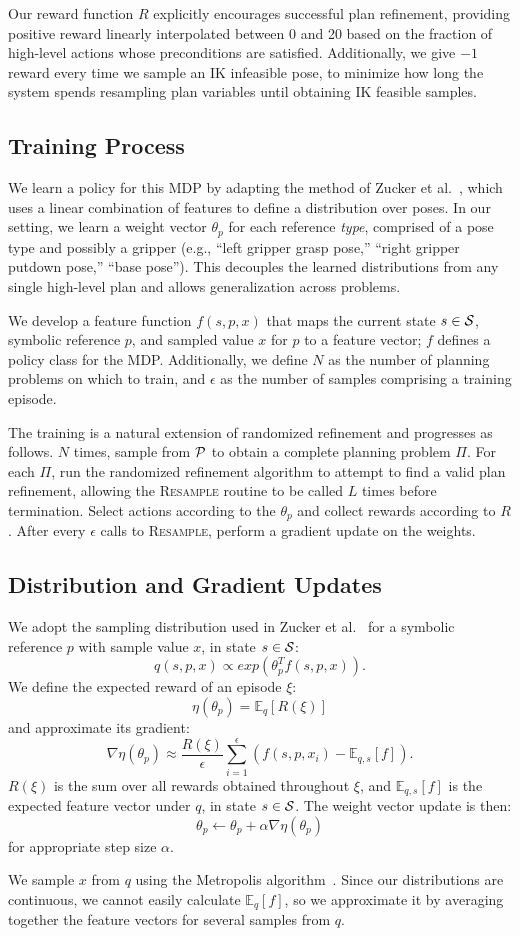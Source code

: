 Our reward function $R$ explicitly encourages successful plan refinement, providing positive reward linearly
interpolated between 0 and 20 based on the fraction of high-level actions whose preconditions are
satisfied. Additionally, we give $-1$ reward every time we sample an IK infeasible pose,
to minimize how long the system spends resampling plan variables until obtaining IK feasible samples.

\subsection{Training Process}
We learn a policy for this MDP by adapting the method of Zucker et al.~\cite{workspacebias}, which
uses a linear combination of features to define a distribution over poses. In our setting, we learn a weight
vector $\theta_{p}$ for each reference \emph{type}, comprised of a pose type and possibly a gripper
(e.g., ``left gripper grasp pose,'' ``right gripper putdown pose,'' ``base pose'').
This decouples the learned distributions from any single high-level plan and allows generalization across problems.

We develop a feature function $f(s, p, x)$ that maps the current
state $s \in \mathcal{S}$, symbolic reference $p$, and sampled value $x$ for $p$ to a
feature vector; $f$ defines a policy class for the MDP. Additionally, we define
$N$ as the number of planning problems on which to train, and
$\epsilon$ as the number of samples comprising a training episode.

The training is a natural extension of randomized
refinement and progresses as follows. $N$ times, sample from $\mathcal{P}$ to obtain
a complete planning problem $\Pi$. For each $\Pi$, run the randomized refinement
algorithm to attempt to find a valid plan refinement, allowing the \textsc{Resample}
routine to be called $L$ times before termination. Select actions according to the $\theta_{p}$
and collect rewards according to $R$. After every $\epsilon$ calls to
\textsc{Resample}, perform a gradient update on the weights.

\subsection{Distribution and Gradient Updates}
We adopt the sampling distribution used in Zucker et al.~\cite{workspacebias}
for a symbolic reference $p$ with sample value $x$, in state $s \in \mathcal{S}$:
$$q(s, p, x) \propto exp(\theta_{p}^{T} f(s, p, x)).$$
We define the expected reward of an episode $\xi$:
$$\eta(\theta_{p}) = \mathbb{E}_{q}[R(\xi)]$$ and approximate its gradient:
$$\nabla \eta(\theta_{p}) \approx \frac{R(\xi)}{\epsilon} \sum_{i=1}^{\epsilon}(f(s, p, x_{i}) - \mathbb{E}_{q,s}[f]).$$
$R(\xi)$ is the sum over all rewards obtained throughout $\xi$, and
$\mathbb{E}_{q,s}[f]$ is the expected feature vector under $q$, in state $s \in \mathcal{S}$. The weight vector update is then:
$$\theta_{p} \leftarrow \theta_{p} + \alpha \nabla \eta(\theta_{p})$$
for appropriate step size $\alpha$.

We sample $x$ from $q$ using the Metropolis algorithm~\cite{chib1995understanding}.
Since our distributions are continuous, we cannot easily calculate $\mathbb{E}_{q}[f]$,
so we approximate it by averaging together the feature vectors for several samples from $q$.